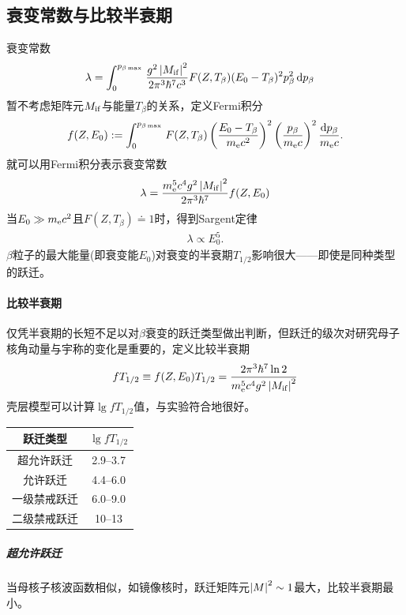 \subsection{衰变常数与比较半衰期}

衰变常数
\begin{align*}
	\lambda&=\int_0^{p_{\beta\max{}}}\frac{g^2\left\lvert M_{\mathrm{i}\mathrm{f}}\right\rvert^2}{2\pi^3\hbar^7c^3}F(Z,T_\beta)(E_0-T_\beta)^2p_\beta^2\mathop{}\!\mathrm{d} p_\beta
\end{align*}
暂不考虑矩阵元$M_{\mathrm{i}\mathrm{f}}$与能量$T_\beta$的关系，定义Fermi积分
\begin{align}
	f(Z,E_0):=\int_0^{p_{\beta\max{}}}F(Z,T_\beta)\left(\frac{E_0-T_\beta}{m_\mathrm e c^2}\right)^2\left(\frac{p_\beta}{m_\mathrm e c}\right)^2\frac{\mathop{}\!\mathrm{d} p_\beta}{m_\mathrm e c}.
\end{align}
就可以用Fermi积分表示衰变常数
\[
	\lambda=\frac{m_\mathrm e^5c^4g^2\left\lvert M_{\mathrm{i}\mathrm{f}}\right\rvert^2}{2\pi^3\hbar^7}f(Z,E_0)
\]
当$E_0\gg m_\mathrm e c^2$且$F(Z,T_\beta)\doteq 1$时，得到Sargent定律
\begin{align}
	\lambda\propto E_0^5.
\end{align}
$\beta$粒子的最大能量(即衰变能$E_0$)对衰变的半衰期$T_{1/2}$影响很大——即使是同种类型的跃迁。
\paragraph{比较半衰期}仅凭半衰期的长短不足以对$\beta$衰变的跃迁类型做出判断，但跃迁的级次对研究母子核角动量与宇称的变化是重要的，定义比较半衰期
\begin{align}
	fT_{1/2}\equiv f(Z,E_0)T_{1/2}=\frac{2\pi^3\hbar^7\ln2}{m_\mathrm e^5c^4g^2\left\lvert M_{\mathrm{i}\mathrm{f}}\right\rvert^2}
\end{align}
壳层模型可以计算$\lg fT_{1/2}$值，与实验符合地很好。
\begin{center}
	\begin{tabular}{cc}
		\toprule
		跃迁类型&$\lg fT_{1/2}$\\
		\midrule
		超允许跃迁&\numrange{2.9}{3.7}\\
		允许跃迁&\numrange{4.4}{6.0}\\
		一级禁戒跃迁&\numrange{6.0}{9.0}\\
		二级禁戒跃迁&\numrange{10}{13}\\
		\bottomrule
	\end{tabular}
\end{center}
\subparagraph{超允许跃迁}当母核子核波函数相似，如镜像核时，跃迁矩阵元$\left\lvert M\right\rvert^2\sim 1$最大，比较半衰期最小。

